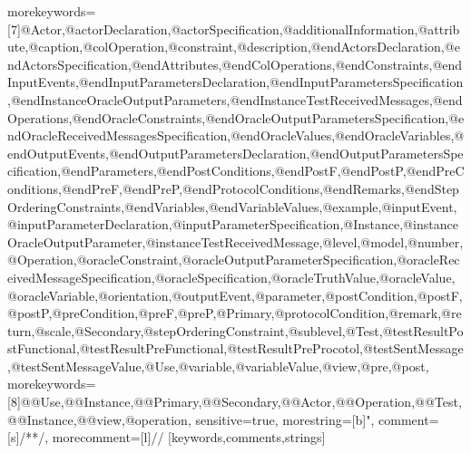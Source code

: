 {    morekeywords=[7]{@Actor,@actorDeclaration,@actorSpecification,@additionalInformation,@attribute,@caption,@colOperation,@constraint,@description,@endActorsDeclaration,@endActorsSpecification,@endAttributes,@endColOperations,@endConstraints,@endInputEvents,@endInputParametersDeclaration,@endInputParametersSpecification,@endInstanceOracleOutputParameters,@endInstanceTestReceivedMessages,@endOperations,@endOracleConstraints,@endOracleOutputParametersSpecification,@endOracleReceivedMessagesSpecification,@endOracleValues,@endOracleVariables,@endOutputEvents,@endOutputParametersDeclaration,@endOutputParametersSpecification,@endParameters,@endPostConditions,@endPostF,@endPostP,@endPreConditions,@endPreF,@endPreP,@endProtocolConditions,@endRemarks,@endStepOrderingConstraints,@endVariables,@endVariableValues,@example,@inputEvent,@inputParameterDeclaration,@inputParameterSpecification,@Instance,@instanceOracleOutputParameter,@instanceTestReceivedMessage,@level,@model,@number,@Operation,@oracleConstraint,@oracleOutputParameterSpecification,@oracleReceivedMessageSpecification,@oracleSpecification,@oracleTruthValue,@oracleValue,@oracleVariable,@orientation,@outputEvent,@parameter,@postCondition,@postF,@postP,@preCondition,@preF,@preP,@Primary,@protocolCondition,@remark,@return,@scale,@Secondary,@stepOrderingConstraint,@sublevel,@Test,@testResultPostFunctional,@testResultPreFunctional,@testResultPreProcotol,@testSentMessage,@testSentMessageValue,@Use,@variable,@variableValue,@view,@pre,@post},
    morekeywords=[8]{@@Use,@@Instance,@@Primary,@@Secondary,@@Actor,@@Operation,@@Test,@@Instance,@@view,@operation},
sensitive=true,
morestring=[b]{"},
comment=[s]{/*}{*/},
morecomment=[l]//
}[keywords,comments,strings]%


\DeclareRobustCommand{\msrsee}{software engineering environment~}

\newcommand\freeblock[4]{%
\begin{textblock}{#1}(#2,#3)
\begin{minipage}{\textwidth}
\setlength{\parindent}{0pt}%
\setlength{\parskip}{0.1cm}%
#4
\end{minipage}
\end{textblock}
}

